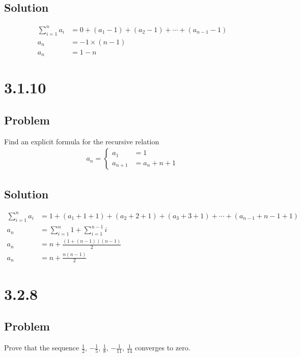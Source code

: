 \documentclass[12pt]{article}
\begin{document}
\subsection*{Solution}
\begin{align*}
    \sum_{i = 1}^n a_i &= 0 + (a_1 - 1) + (a_2 - 1) + \cdots + (a_{n - 1} - 1) \\
    a_n &= -1 \times (n - 1) \\
    a_n &= 1 - n
\end{align*}



\section*{3.1.10}

\subsection*{Problem}
Find an explicit formula for the recursive relation
\begin{align*}
    a_n = \begin{cases}
        a_1 &= 1 \\
        a_{n + 1} &= a_n + n + 1
    \end{cases}
\end{align*}

\subsection*{Solution}
\begin{align*}
    \sum_{i = 1}^n a_i &= 1 + (a_1 + 1 + 1) + (a_2 + 2 + 1) + (a_3 + 3 + 1) + \cdots + (a_{n - 1} + n - 1 + 1) \\
    a_n &= \sum_{i = 1}^n 1 + \sum_{i = 1}^{n - 1} i \\
    a_n &= n + \frac{(1 + (n - 1)) (n - 1)}{2} \\
    a_n &= n + \frac{n(n - 1)}{2}
\end{align*}



\section*{3.2.8}

\subsection*{Problem}
Prove that the sequence $\frac{1}{2}$, $-\frac{1}{5}$, $\frac{1}{8}$, $-\frac{1}{11}$, $\frac{1}{14}$ converges to zero.
\end{document}
